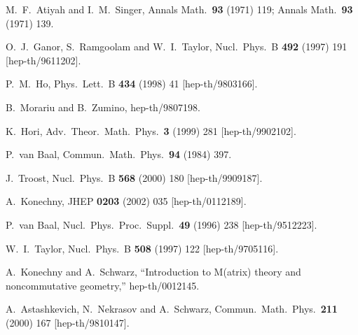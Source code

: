 \documentclass[a4paper,epsf,12pt]{article}
\begin{document}
\begin{thebibliography}{99}
M.~F.~Atiyah and I.~M.~Singer,
Annals Math.\  {\bf 93} (1971) 119;
Annals Math.\  {\bf 93} (1971) 139.

O.~J.~Ganor, S.~Ramgoolam and W.~I.~Taylor,
Nucl.\ Phys.\ B {\bf 492} (1997) 191
[hep-th/9611202].

P.~M.~Ho,
Phys.\ Lett.\ B {\bf 434} (1998) 41
[hep-th/9803166].

B.~Morariu and B.~Zumino,
hep-th/9807198.

K.~Hori,
Adv.\ Theor.\ Math.\ Phys.\  {\bf 3} (1999) 281
[hep-th/9902102].

P.~van Baal,
Commun.\ Math.\ Phys.\  {\bf 94} (1984) 397.

J.~Troost,
Nucl.\ Phys.\ B {\bf 568} (2000) 180
[hep-th/9909187].

A.~Konechny,
JHEP {\bf 0203} (2002) 035
[hep-th/0112189].

P.~van Baal,
Nucl.\ Phys.\ Proc.\ Suppl.\  {\bf 49} (1996) 238
[hep-th/9512223].

W.~I.~Taylor,
Nucl.\ Phys.\ B {\bf 508} (1997) 122
[hep-th/9705116].

A.~Konechny and A.~Schwarz,
``Introduction to M(atrix) theory and noncommutative geometry,''
hep-th/0012145.

A.~Astashkevich, N.~Nekrasov and A.~Schwarz,
Commun.\ Math.\ Phys.\  {\bf 211} (2000) 167
[hep-th/9810147].


\end{thebibliography}
\end{document}
